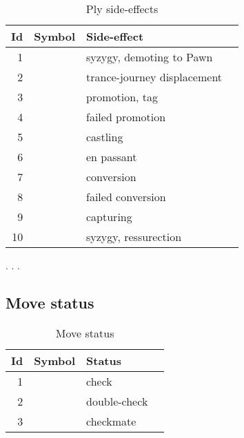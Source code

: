 \begin{table}[!h]
\centering
\begin{tabular}{ rlll }
\toprule
\textbf{Id} & \textbf{Symbol}      & \textbf{Side-effect}           \\
\midrule
1           & \alg{>}              & syzygy, demoting to Pawn       \\
2           & \alg{<}              & trance-journey displacement    \\
3           & \alg{=}              & promotion, tag                 \\
4           & \alg{==}             & failed promotion               \\
5           & \alg{\&}             & castling                       \\
6           & \alg{:}              & en passant                     \\
7           & \alg{\%}             & conversion                     \\
8           & \alg{\%\%}           & failed conversion              \\
9           & \alg{*}              & capturing                      \\
10          & \alg{\$}             & syzygy, ressurection           \\
\bottomrule
\end{tabular}
\caption{Ply side-effects}
\label{tbl:Appendix/Ply side-effects}
\end{table}

. . .

\clearpage %

\subsection*{Move status}
\label{sec:Appendix/Move status}

\begin{table}[!h]
\centering
\begin{tabular}{ rlll }
\toprule
\textbf{Id} & \textbf{Symbol}      & \textbf{Status}                \\
\midrule
1           & \alg{+}              & check                          \\
2           & \alg{++}             & double-check                   \\
3           & \alg{\#}             & checkmate                      \\
\bottomrule
\end{tabular}
\caption{Move status}
\label{tbl:Appendix/Move status}
\end{table}

